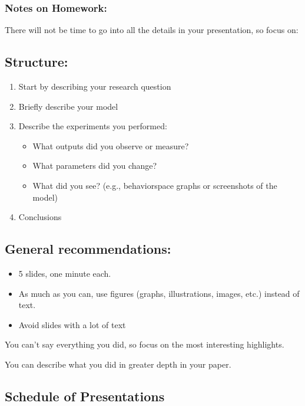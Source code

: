 \documentclass[
]{article}
\providecommand{\tightlist}{%
  \setlength{\itemsep}{0pt}\setlength{\parskip}{0pt}}
\begin{document}
\subsubsection{Notes on Homework:}\label{notes-on-homework-9}

There will not be time to go into all the details in your presentation,
so focus on:

\subsection{Structure:}\label{structure}

\begin{enumerate}
\tightlist
\item
  Start by describing your research question
\item
  Briefly describe your model
\item
  Describe the experiments you performed:

  \begin{itemize}
  \tightlist
  \item
    What outputs did you observe or measure?
  \item
    What parameters did you change?
  \item
    What did you see? (e.g., behaviorspace graphs or screenshots of the
    model)
  \end{itemize}
\item
  Conclusions
\end{enumerate}

\subsection{General recommendations:}\label{general-recommendations}

\begin{itemize}
\tightlist
\item
  5 slides, one minute each.
\item
  As much as you can, use figures (graphs, illustrations, images, etc.)
  instead of text.
\item
  Avoid slides with a lot of text
\end{itemize}

You can't say everything you did, so focus on the most interesting
highlights.

You can describe what you did in greater depth in your paper.

\subsection{Schedule of Presentations}\label{schedule-of-presentations}
\end{document}
